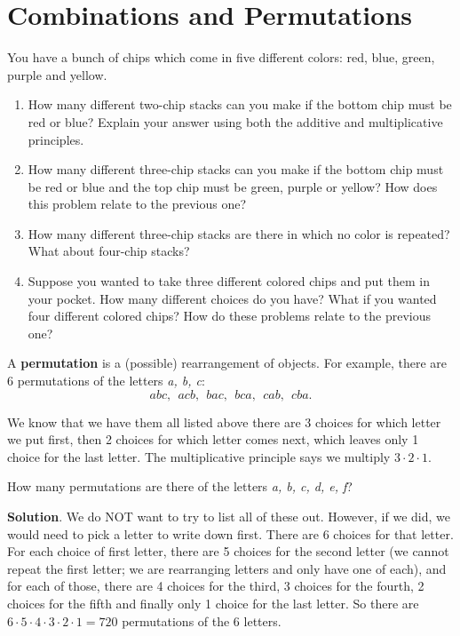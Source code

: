\documentclass[11pt,]{book}
\newcommand{\terminology}[1]{\textbf{#1}}
\theoremstyle{ptxplainnotitle}
\theoremstyle{ptxplaintitle}
\theoremstyle{ptxdefinitionnotitle}
\theoremstyle{ptxdefinitiontitle}
\theoremstyle{ptxdefinitionnotitle}
\theoremstyle{ptxdefinitiontitle}
\theoremstyle{ptxdefinitionnotitle}
\theoremstyle{ptxdefinitiontitle}
\theoremstyle{ptxdefinitiontitlenonumber}
\theoremstyle{ptxdefinitiontitlenonumber}
\numberwithin{equation}{chapter}
\begin{document}
\section[{Combinations and Permutations}]{Combinations and Permutations}\label{sec_counting-combperm}
\begin{investigation}\label{investigation-13}
\hypertarget{p-1509}{}%
You have a bunch of chips which come in five different colors: red, blue, green, purple and yellow. %
\begin{enumerate}
\item\hypertarget{li-661}{}\hypertarget{p-1510}{}%
How many different two-chip stacks can you make if the bottom chip must be red or blue? Explain your answer using both the additive and multiplicative principles.%
\item\hypertarget{li-662}{}\hypertarget{p-1511}{}%
How many different three-chip stacks can you make if the bottom chip must be red or blue and the top chip must be green, purple or yellow? How does this problem relate to the previous one?%
\item\hypertarget{li-663}{}\hypertarget{p-1512}{}%
How many different three-chip stacks are there in which no color is repeated? What about four-chip stacks?%
\item\hypertarget{li-664}{}\hypertarget{p-1513}{}%
Suppose you wanted to take three different colored chips and put them in your pocket. How many different choices do you have? What if you wanted four different colored chips? How do these problems relate to the previous one?%
\end{enumerate}
%
\end{investigation}
\hypertarget{p-1514}{}%
A \terminology{permutation} is a (possible) rearrangement of objects. For example, there are 6 permutations of the letters \emph{a, b, c}:%
\begin{equation*}
abc, ~~ acb, ~~ bac, ~~bca, ~~ cab, ~~ cba.
\end{equation*}
%
\par
\hypertarget{p-1515}{}%
We know that we have them all listed above \textemdash{}there are 3 choices for which letter we put first, then 2 choices for which letter comes next, which leaves only 1 choice for the last letter. The multiplicative principle says we multiply \(3\cdot 2 \cdot 1\).%
\begin{example}\label{example-42}
\hypertarget{p-1516}{}%
How many permutations are there of the letters \emph{a, b, c, d, e, f}?%
\par\smallskip%
\noindent\textbf{Solution}.\hypertarget{solution-199}{}\quad%
\hypertarget{p-1517}{}%
We do NOT want to try to list all of these out. However, if we did, we would need to pick a letter to write down first. There are 6 choices for that letter. For each choice of first letter, there are 5 choices for the second letter (we cannot repeat the first letter; we are rearranging letters and only have one of each), and for each of those, there are 4 choices for the third, 3 choices for the fourth, 2 choices for the fifth and finally only 1 choice for the last letter. So there are \(6 \cdot 5 \cdot 4 \cdot 3 \cdot 2 \cdot 1 = 720\) permutations of the 6 letters.%
\end{example}
\end{document}

